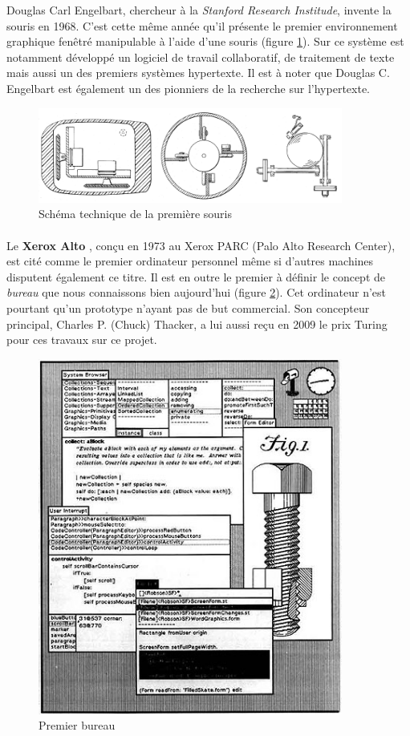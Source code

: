 Douglas Carl Engelbart, chercheur à la \textit{Stanford Research Institude}, invente la souris en 1968.
C'est cette même année qu'il présente le premier environnement graphique fenêtré manipulable à l'aide d'une souris (figure \ref{fig:first_mouse}). Sur ce système est notamment développé un logiciel de travail collaboratif, de traitement de texte mais aussi un des premiers systèmes hypertexte. Il est à noter que Douglas C. Engelbart est également un des pionniers de la recherche sur l'hypertexte. 

\begin{figure}[H]
   \centering
    \includegraphics[width=10cm]{figures/image3.png}
  \caption{Schéma technique de la première souris \cite{wiki:souris}}
  \label{fig:first_mouse}
\end{figure}

\paragraph{}
Le \textbf{Xerox Alto} \label{inline:xerox_alto}, conçu en 1973 au Xerox PARC (Palo Alto Research Center), est cité comme le premier ordinateur personnel même si d'autres machines disputent également ce titre. Il est en outre le premier à définir le concept de \textit{bureau} que nous connaissons bien aujourd'hui (figure \ref{fig:alto_desktop}). Cet ordinateur n'est pourtant qu'un prototype n'ayant pas de but commercial. Son concepteur principal, Charles P. (Chuck) Thacker, a lui aussi reçu en 2009 le prix Turing pour ces travaux sur ce projet.

\begin{figure}[H]
  \centering
    \includegraphics[width=10cm]{figures/alto_desktop.jpg}
  \caption{Premier bureau \cite{digibarn:alto}}
  \label{fig:alto_desktop}
\end{figure}


